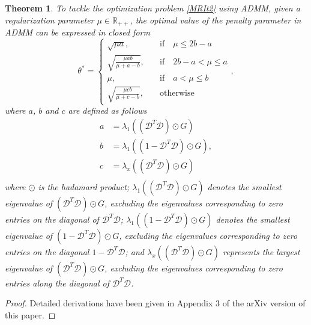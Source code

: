\documentclass[letterpaper]{article} %
\newtheorem{theorem}{Theorem}
\begin{document}
\begin{theorem}
To tackle the optimization problem \eqref{MRIt2} using ADMM, given a regularization parameter $\mu\in \mathbb{R}_{++}$, the optimal value of the penalty parameter in ADMM can be expressed in closed form
\begin{equation*}
	\theta^*=
	\begin{cases}
		\sqrt{\mu a},\quad & \text{if}\quad  \mu \leq 2b- a\\
		\sqrt{\frac{\mu a b}{\mu+a-b}},\quad & \text{if}\quad  2b - a <\mu \leq a \\
		\mu,\quad & \text{if}\quad a < \mu \leq b\\
		\sqrt{\frac{\mu c b}{\mu+c-b}},\quad & \text{otherwise}
	\end{cases},
\end{equation*}
where $a$, $b$ and $c$ are defined as follows
\begin{equation*}
    \begin{split}
    a &= \lambda_1((\mathcal{D}^T \mathcal{D}) \odot G)\\
    b &= \lambda_1( (1 -\mathcal{D}^T \mathcal{D}) \odot G),\\
    c &= \lambda_x( (\mathcal{D}^T \mathcal{D} )\odot G)\\
\end{split}
\end{equation*}
where $\odot$ is the hadamard product; $\lambda_1((\mathcal{D}^T \mathcal{D}) \odot G)$ denotes the smallest eigenvalue of $(\mathcal{D}^T \mathcal{D}) \odot G$, excluding the eigenvalues corresponding to zero entries on the diagonal of $\mathcal{D}^T \mathcal{D}$;
$\lambda_1( (1 -\mathcal{D}^T \mathcal{D}) \odot G)$ denotes the smallest eigenvalue of $(1- \mathcal{D}^T \mathcal{D}) \odot G$, excluding the eigenvalues corresponding to zero entries on the diagonal $1-\mathcal{D}^T \mathcal{D}$; and
$\lambda_x((\mathcal{D}^T \mathcal{D}) \odot G)$ represents the largest eigenvalue of $(\mathcal{D}^T \mathcal{D}) \odot G$, excluding the eigenvalues corresponding to zero entries along the diagonal of $\mathcal{D}^T \mathcal{D}$.
\end{theorem}

\begin{proof}
Detailed derivations have been given in Appendix 3 of the arXiv version of this paper.
\end{proof}
\end{document}
